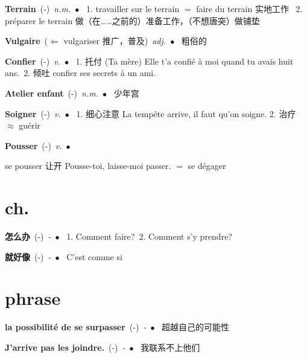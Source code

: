 \documentclass[10pt,a4paper,twoside]{article} %
\newcommand{\entry}[4]{\textbf{#1}\ {(#2)}\ \textit{#3}\ $\bullet$\ {#4}} %
\begin{document}
\begin{CJK*}{UTF8}{gkai}
\begin{multicols}{2}
\entry{Terrain}{-}{n.m.}
{
1. travailler sur le terrain $=$ faire du terrain 实地工作 \ 
2. préparer le terrain 做（在……之前的）准备工作，（不想唐突）做铺垫 
}

\entry{Vulgaire}{$\Leftarrow$ vulgariser 推广，普及}{adj.}
{
粗俗的
}

\entry{Confier}{-}{v.}
{
1. 托付 (Ta mère) Elle t'a confié à moi quand tu avais huit ans.\ 
2. 倾吐 confier ses secrets à un ami.
}

\entry{Atelier enfant}{-}{n.m.}
{
少年宫
}

\entry{Soigner}{-}{v.}
{
1. 细心注意 La tempête arrive, il faut qu'on soigne.
2. 治疗 $\approx$ guérir
}

\entry{Pousser}{-}{v.}
{
se pousser 让开 Pousse-toi, laisse-moi passer. $=$ se dégager

}

\end{multicols}


\section*{ch.}

\begin{multicols}{2}

\entry{怎么办}{-}{-}
{
1. Comment faire?\ 
2. Comment s'y prendre?\ 
}

\entry{就好像}{-}{-}
{
C'est comme si 
}



\end{multicols}



\section*{phrase}

\begin{multicols}{2}

\entry{la possibilité de se surpasser}{-}{-}
{
超越自己的可能性
}

\entry{J'arrive pas les joindre.}{-}{-}
{
我联系不上他们
}


\end{multicols}
\end{CJK*}
\end{document}

